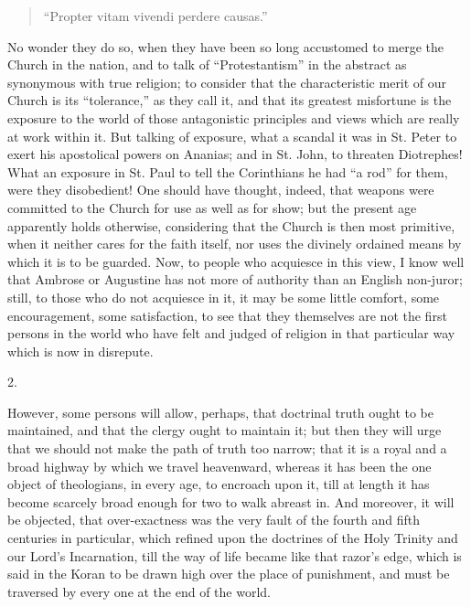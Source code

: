 \begin{quote}

``Propter vitam vivendi perdere causas.''

\end{quote}

No wonder they do so, when they have been so long accustomed to
merge the Church in the nation, and to talk of
``Protestantism'' in the abstract as synonymous with true
religion; to consider that the characteristic merit of our Church is
its ``tolerance,'' as they call it, and that its greatest
misfortune is the exposure to the world of those antagonistic
principles and views which are really at work within it. But talking
of exposure, what a scandal it was in St. Peter to exert his
apostolical powers on Ananias; and in St. John, to threaten Diotrephes!
What an exposure in St. Paul to tell the Corinthians he had ``a
rod'' for them, were they disobedient! One should have thought,
indeed, that weapons were committed to the Church for use as well as
for show; but the present age apparently holds otherwise, considering
that the Church is then most primitive, when it neither cares for the
faith itself, nor uses the divinely ordained means by which it is to
be guarded. Now, to people who acquiesce in this view, I know well
that Ambrose or Augustine has not more of authority than an English
non-juror; still, to those who do not acquiesce in it, it may be some
little comfort, some encouragement, some satisfaction, to see that
they themselves are not the first persons in the world who have felt
and judged of religion in that particular way which is now in
disrepute.

2.

However, some persons will allow, perhaps, that doctrinal truth
ought to be maintained, and that the clergy ought to maintain
it; but then they will urge that we should not make the path of truth
too narrow; that it is a royal and a broad highway by which we travel
heavenward, whereas it has been the one object of theologians, in
every age, to encroach upon it, till at length it has become scarcely
broad enough for two to walk abreast in. And moreover, it will be
objected, that over-exactness was the very fault of the fourth and
fifth centuries in particular, which refined upon the doctrines of the
Holy Trinity and our Lord's Incarnation, till the way of life became
like that razor's edge, which is said in the Koran to be drawn high
over the place of punishment, and must be traversed by every one at
the end of the world.

